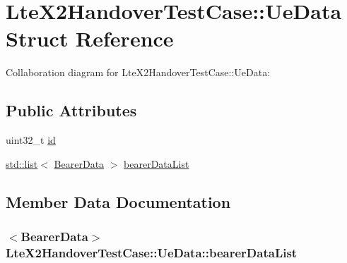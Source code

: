 \hypertarget{structLteX2HandoverTestCase_1_1UeData}{}\section{Lte\+X2\+Handover\+Test\+Case\+:\+:Ue\+Data Struct Reference}
\label{structLteX2HandoverTestCase_1_1UeData}


Collaboration diagram for Lte\+X2\+Handover\+Test\+Case\+:\+:Ue\+Data\+:
\subsection*{Public Attributes}
\begin{DoxyCompactItemize}
\item 
uint32\+\_\+t \hyperlink{structLteX2HandoverTestCase_1_1UeData_a4495b7275f4dc19135a1fbb862d10384}{id}
\item 
\hyperlink{openflow-interface_8h_afd9bcfa176617760671b67580f536fa7}{std\+::list}$<$ \hyperlink{structLteX2HandoverTestCase_1_1BearerData}{Bearer\+Data} $>$ \hyperlink{structLteX2HandoverTestCase_1_1UeData_a175512da01144cb412395ec0a6be65b5}{bearer\+Data\+List}
\end{DoxyCompactItemize}


\subsection{Member Data Documentation}
\subsubsection[{\texorpdfstring{bearer\+Data\+List}{bearerDataList}}]{$<${\bf Bearer\+Data}$>$ Lte\+X2\+Handover\+Test\+Case\+::\+Ue\+Data\+::bearer\+Data\+List}\hypertarget{structLteX2HandoverTestCase_1_1UeData_a175512da01144cb412395ec0a6be65b5}{}\label{structLteX2HandoverTestCase_1_1UeData_a175512da01144cb412395ec0a6be65b5}
